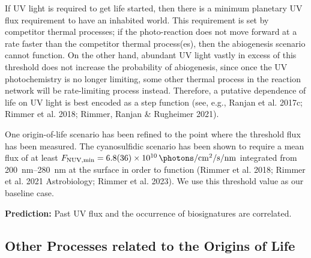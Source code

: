 \documentclass[modern,linenumbers]{aastex631}
\begin{document}
If UV light is required to get life started, then there is a minimum planetary UV flux requirement to have an inhabited world.
This requirement is set by competitor thermal processes; if the photo-reaction does not move forward at a rate faster than the competitor thermal process(es), then the abiogenesis scenario cannot function.
On the other hand, abundant UV light vastly in excess of this threshold does not increase the probability of abiogenesis, since once the UV photochemistry is no longer limiting, some other thermal process in the reaction network will be rate-limiting process instead.
Therefore, a putative dependence of life on UV light is best encoded as a step function (see, e.g., Ranjan et al. 2017c; Rimmer et al. 2018; Rimmer, Ranjan \& Rugheimer 2021).

One origin-of-life scenario has been refined to the point where the threshold flux has been measured.
The cyanosulfidic scenario has been shown to require a mean flux of at least $ F_\mathrm{NUV, min} = \SI{6.8\pm3.6 e10}{\photons\per\centi\meter\squared\per\second\per\nano\meter}$ integrated from \SIrange{200}{280}{\nano\meter} at the surface in order to function (Rimmer et al. 2018; Rimmer et al. 2021 Astrobiology; Rimmer et al. 2023).
We use this threshold value as our baseline case.

\textbf{Prediction:} Past UV flux and the occurrence of biosignatures are correlated.


\subsection{Other Processes related to the Origins of Life}
\end{document}
